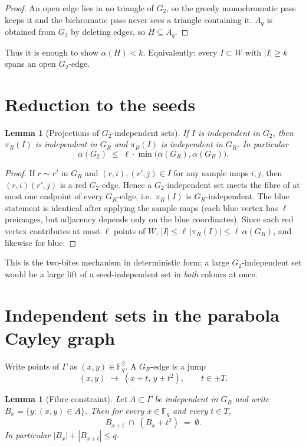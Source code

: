 \documentclass[11pt]{article}
\newtheorem{lemma}[theorem]{Lemma}
\theoremstyle{definition}
\newcommand{\F}{\mathbb{F}}
\begin{document}
\begin{proof}
An open edge lies in no triangle of $G_2$, so the greedy monochromatic pass keeps it and the bichromatic pass never sees a triangle containing it.
$A_q$ is obtained from $G_2$ by deleting edges, so $H\subseteq A_q$.
\end{proof}

Thus it is enough to show $\alpha(H)<k$.
Equivalently: every $I\subset W$ with $|I|\ge k$ spans an open $G_2$-edge.

\section{Reduction to the seeds}

\begin{lemma}[Projections of $G_2$-independent sets]\label{lem:proj}
If $I$ is independent in $G_2$, then $\pi_R(I)$ is independent in $G_R$ and $\pi_B(I)$ is independent in $G_B$.
In particular
\[
  \alpha(G_2)\;\le\;\ell\cdot\min\bigl(\alpha(G_R),\alpha(G_B)\bigr).
\]
\end{lemma}

\begin{proof}
If $r\sim r'$ in $G_R$ and $(r,i),(r',j)\in I$ for any sample maps $i,j$, then $(r,i)(r',j)$ is a red $G_2$-edge.
Hence a $G_2$-independent set meets the fibre of at most one endpoint of every $G_R$-edge, i.e.\ $\pi_R(I)$ is $G_R$-independent.
The blue statement is identical after applying the sample maps (each blue vertex has $\ell$ preimages, but adjacency depends only on the blue coordinates).
Since each red vertex contributes at most $\ell$ points of $W$, $|I|\le\ell\,|\pi_R(I)|\le\ell\,\alpha(G_R)$, and likewise for blue.
\end{proof}

This is the two-bites mechanism in deterministic form: a large $G_2$-independent set would be a large lift of a seed-independent set in \emph{both} colours at once.

\section{Independent sets in the parabola Cayley graph}

Write points of $\Gamma$ as $(x,y)\in\F_q^{2}$.
A $G_R$-edge is a jump
\[
  (x,y)\;\longrightarrow\;(x+t,\,y+t^{2}),
  \qquad t\in\pm T.
\]

\begin{lemma}[Fibre constraint]\label{lem:fibre}
Let $A\subset\Gamma$ be independent in $G_R$ and write $B_x=\{y:(x,y)\in A\}$.
Then for every $x\in\F_q$ and every $t\in T$,
\[
  B_{x+t}\;\cap\;(B_x+t^{2})\;=\;\emptyset.
\]
In particular $|B_x|+|B_{x+t}|\le q$.
\end{lemma}
\end{document}
